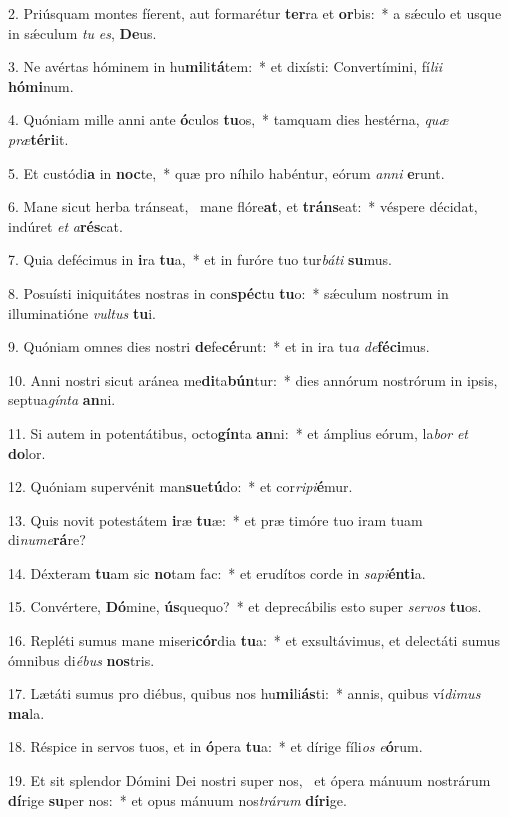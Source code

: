 2. Priúsquam montes fíerent, aut formarétur \textbf{ter}ra et \textbf{or}bis:~*  a sǽculo et usque in sǽculum \textit{tu} \textit{es}, \textbf{De}us.\

3. Ne avértas hóminem in hu\textbf{mi}li\textbf{tá}tem:~*  et dixísti: Convertímini, fí\textit{li}\textit{i} \textbf{hó}\textbf{mi}num.\

4. Quóniam mille anni ante \textbf{ó}culos \textbf{tu}os,~*  tamquam dies hestérna, \textit{quæ} \textit{præ}\textbf{tér}\textbf{i}it.\

5. Et custódi\textbf{a} in \textbf{noc}te,~*  quæ pro níhilo habéntur, eórum \textit{an}\textit{ni} \textbf{e}runt.\

6. Mane sicut herba tránseat, \dag\  mane flóre\textbf{at}, et \textbf{tráns}eat:~*  véspere décidat, indúret \textit{et} \textit{a}\textbf{rés}cat.\

7. Quia defécimus in \textbf{i}ra \textbf{tu}a,~*  et in furóre tuo tur\textit{bá}\textit{ti} \textbf{su}mus.\

8. Posuísti iniquitátes nostras in con\textbf{spéc}tu \textbf{tu}o:~*  sǽculum nostrum in illuminatióne \textit{vul}\textit{tus} \textbf{tu}i.\

9. Quóniam omnes dies nostri \textbf{de}fe\textbf{cé}runt:~*  et in ira tu\textit{a} \textit{de}\textbf{fé}\textbf{ci}mus.\

10. Anni nostri sicut aránea me\textbf{di}ta\textbf{bún}tur:~*  dies annórum nostrórum in ipsis, septua\textit{gín}\textit{ta} \textbf{an}ni.\

11. Si autem in potentátibus, octo\textbf{gín}ta \textbf{an}ni:~*  et ámplius eórum, la\textit{bor} \textit{et} \textbf{do}lor.\

12. Quóniam supervénit man\textbf{su}e\textbf{tú}do:~*  et cor\textit{ri}\textit{pi}\textbf{é}mur.\

13. Quis novit potestátem \textbf{i}ræ \textbf{tu}æ:~*  et præ timóre tuo iram tuam di\textit{nu}\textit{me}\textbf{rá}re?\

14. Déxteram \textbf{tu}am sic \textbf{no}tam fac:~*  et erudítos corde in \textit{sa}\textit{pi}\textbf{én}\textbf{ti}a.\

15. Convértere, \textbf{Dó}mine, \textbf{ús}quequo?~*  et deprecábilis esto super \textit{ser}\textit{vos} \textbf{tu}os.\

16. Repléti sumus mane miseri\textbf{cór}dia \textbf{tu}a:~*  et exsultávimus, et delectáti sumus ómnibus di\textit{é}\textit{bus} \textbf{nos}tris.\

17. Lætáti sumus pro diébus, quibus nos hu\textbf{mi}li\textbf{ás}ti:~*  annis, quibus ví\textit{di}\textit{mus} \textbf{ma}la.\

18. Réspice in servos tuos, et in \textbf{ó}pera \textbf{tu}a:~*  et dírige fíli\textit{os} \textit{e}\textbf{ó}rum.\

19. Et sit splendor Dómini Dei nostri super nos, \dag\  et ópera mánuum nostrárum \textbf{dí}rige \textbf{su}per nos:~*  et opus mánuum nos\textit{trá}\textit{rum} \textbf{dí}\textbf{ri}ge.\

